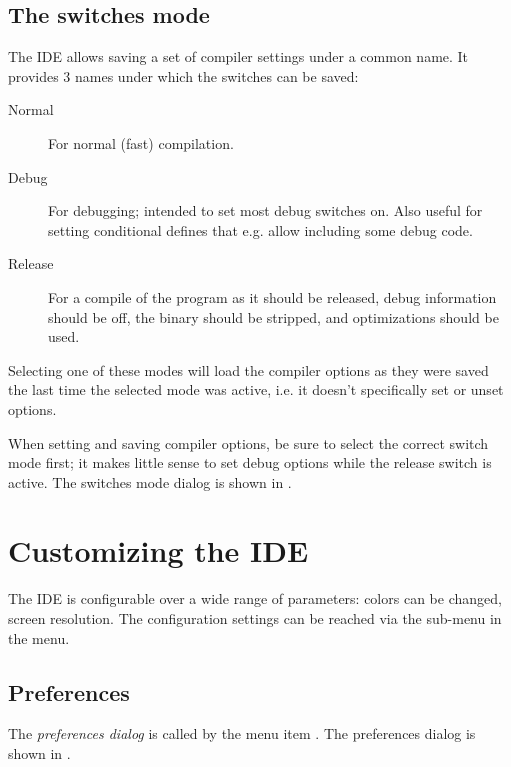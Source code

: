 %
%
\subsection{The switches mode}
\label{se:compilermode}
The IDE allows saving a set of compiler settings under a common name. 
It provides 3 names under which the switches can be saved:
\begin{description}
\item[Normal] For normal (fast) compilation.
\item[Debug] For debugging; intended to set most debug switches on. Also
useful for setting conditional defines that e.g. allow including some
debug code.
\item[Release] For a compile of the program as it should be released, debug
information should be off, the binary should be stripped, and optimizations
should be used.
\end{description}
Selecting one of these modes will load the compiler options as they were
saved the last time the selected mode was active, i.e. it doesn't
specifically set or unset options.

When setting and saving compiler options, be sure to select the correct
switch mode first; it makes little sense to set debug options while the
release switch is active.
The switches mode dialog is shown in .


\section{Customizing the IDE}
The IDE is configurable over a wide range of parameters: colors can be changed, 
screen resolution. The configuration settings can be reached via the
sub-menu  in the  menu.
%
%
\subsection{Preferences}
The {\em preferences dialog} is called by the menu item
.
The preferences dialog is shown in .


